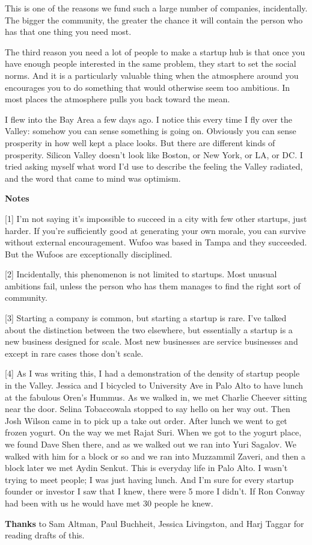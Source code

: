 This is one of the reasons we fund such a large number of companies,
incidentally. The bigger the community, the greater the chance it will
contain the person who has that one thing you need most.

The third reason you need a lot of people to make a startup hub is that
once you have enough people interested in the same problem, they start
to set the social norms. And it is a particularly valuable thing when
the atmosphere around you encourages you to do something that would
otherwise seem too ambitious. In most places the atmosphere pulls you
back toward the mean.

I flew into the Bay Area a few days ago. I notice this every time I fly
over the Valley: somehow you can sense something is going on. Obviously
you can sense prosperity in how well kept a place looks. But there are
different kinds of prosperity. Silicon Valley doesn't look like Boston,
or New York, or LA, or DC. I tried asking myself what word I'd use to
describe the feeling the Valley radiated, and the word that came to mind
was optimism.

\textbf{Notes}

{[}1{]} I'm not saying it's impossible to succeed in a city with few
other startups, just harder. If you're sufficiently good at generating
your own morale, you can survive without external encouragement. Wufoo
was based in Tampa and they succeeded. But the Wufoos are exceptionally
disciplined.

{[}2{]} Incidentally, this phenomenon is not limited to startups. Most
unusual ambitions fail, unless the person who has them manages to find
the right sort of community.

{[}3{]} Starting a company is common, but starting a startup is rare.
I've talked about the distinction between the two elsewhere, but
essentially a startup is a new business designed for scale. Most new
businesses are service businesses and except in rare cases those don't
scale.

{[}4{]} As I was writing this, I had a demonstration of the density of
startup people in the Valley. Jessica and I bicycled to University Ave
in Palo Alto to have lunch at the fabulous Oren's Hummus. As we walked
in, we met Charlie Cheever sitting near the door. Selina Tobaccowala
stopped to say hello on her way out. Then Josh Wilson came in to pick up
a take out order. After lunch we went to get frozen yogurt. On the way
we met Rajat Suri. When we got to the yogurt place, we found Dave Shen
there, and as we walked out we ran into Yuri Sagalov. We walked with him
for a block or so and we ran into Muzzammil Zaveri, and then a block
later we met Aydin Senkut. This is everyday life in Palo Alto. I wasn't
trying to meet people; I was just having lunch. And I'm sure for every
startup founder or investor I saw that I knew, there were 5 more I
didn't. If Ron Conway had been with us he would have met 30 people he
knew.

\textbf{Thanks} to Sam Altman, Paul Buchheit, Jessica Livingston, and
Harj Taggar for reading drafts of this.
